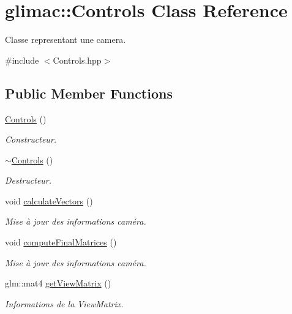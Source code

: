 \hypertarget{classglimac_1_1Controls}{}\section{glimac\+:\+:Controls Class Reference}
\label{classglimac_1_1Controls}


Classe representant une camera.  




{\ttfamily \#include $<$Controls.\+hpp$>$}

\subsection*{Public Member Functions}
\begin{DoxyCompactItemize}
\item 
\hyperlink{classglimac_1_1Controls_a79e53d145de5f030bf72689db7bc928c}{Controls} ()
\begin{DoxyCompactList}\small\item\em Constructeur. \end{DoxyCompactList}\item 
\hyperlink{classglimac_1_1Controls_ac2fdd147ad3c35e410b70a58559544e3}{$\sim$\+Controls} ()
\begin{DoxyCompactList}\small\item\em Destructeur. \end{DoxyCompactList}\item 
void \hyperlink{classglimac_1_1Controls_a1937e9b03344764ec2bb608cf5d42f20}{calculate\+Vectors} ()
\begin{DoxyCompactList}\small\item\em Mise à jour des informations caméra. \end{DoxyCompactList}\item 
void \hyperlink{classglimac_1_1Controls_a03104d031d93fdb96ab945d385ecdca0}{compute\+Final\+Matrices} ()
\begin{DoxyCompactList}\small\item\em Mise à jour des informations caméra. \end{DoxyCompactList}\item 
glm\+::mat4 \hyperlink{classglimac_1_1Controls_ac71089c5a9f4f1d78c5bbfeec6fef620}{get\+View\+Matrix} ()
\begin{DoxyCompactList}\small\item\em Informations de la View\+Matrix. \end{DoxyCompactList}\item 

\end{DoxyCompactItemize}
